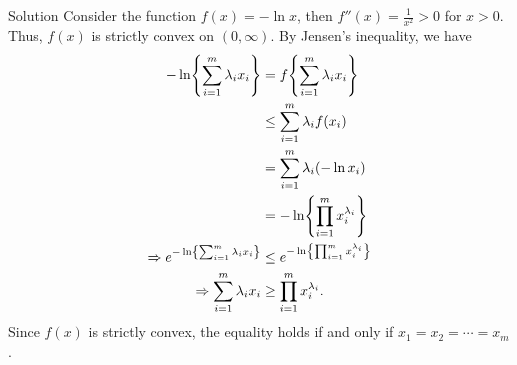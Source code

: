 \documentclass{article}
\begin{document}
\begin{solution}
    {Solution}
    Consider the function $f(x)=-\ln x$, then $f''(x)=\frac{1}{x^2}>0$ for $x>0$. Thus, $f(x)$ is strictly convex on $(0,\infty)$. By Jensen's inequality, we have {
        \begin{align*}
            -\ln\braces*{\sum_{i=1}^{m}\lambda_ix_i}
            &= f\braces*{\sum_{i=1}^{m}\lambda_ix_i}\\
            &\leq \sum_{i=1}^{m}\lambda_i f(x_i)\\
            &= \sum_{i=1}^{m}\lambda_i(-\ln x_i)\\
            &= -\ln\braces*{\prod_{i=1}^{m}x_i^{\lambda_i}} \\
            \Rightarrow
            e^{-\ln\braces*{\sum_{i=1}^{m}\lambda_ix_i}}
            &\leq e^{-\ln\braces*{\prod_{i=1}^{m}x_i^{\lambda_i}}}\\
            \Rightarrow
            \sum_{i=1}^{m}\lambda_ix_i &\geq \prod_{i=1}^{m}x_i^{\lambda_i}.
        \end{align*}
    }
    Since $f(x)$ is strictly convex, the equality holds if and only if $x_1=x_2=\cdots=x_m$.
\end{solution}
\end{document}
